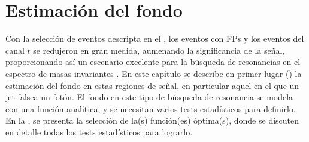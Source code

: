 \chapter{Estimaci\'on del fondo}
\label{ch:bkg}


Con la selección de eventos descripta en el \Ch{\ref{ch:evt_selection}}, los eventos con \acp{FP} y los eventos del canal \(t\) se redujeron en gran medida, aumenando la significancia de la señal, proporcionando as\'i un escenario excelente para la búsqueda de resonancias en el espectro de masas invariantes \myj. En este capítulo se describe en primer lugar (\Sect{\ref{sec:bkg:estimation}}) la estimación del fondo en estas regiones de señal, en particular aquel en el que un jet falsea un fotón. El fondo en este tipo de búsqueda de resonancia se modela con una función analítica, y se necesitan varios tests estadísticos para definirlo. En la \Sect{\ref{sec:bkg:modeling}}, se presenta la selección de la(s) función(es) óptima(s), donde se discuten en detalle todas los tests estadísticos para lograrlo.





